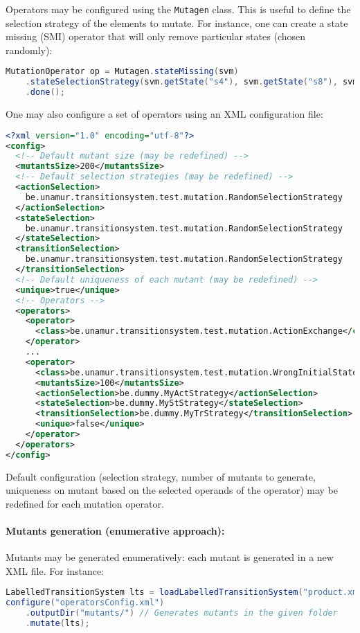 Operators may be configured using the \texttt{Mu\-ta\-gen} class. This is useful to define the selection strategy of the elements to mutate. For instance, one can create a state missing (SMI) operator that will only remove particular states (chosen randomly):
%
\begin{lstlisting}[language=Java,frame=single,numbers=none]
MutationOperator op = Mutagen.stateMissing(svm)
	.stateSelectionStrategy(svm.getState("s4"), svm.getState("s8"), svm.getState("s9"))
	.done();
\end{lstlisting}
%
One may also configure a set of operators using an XML configuration file:
%
\begin{lstlisting}[language=XML,frame=single,numbers=none]
<?xml version="1.0" encoding="utf-8"?>
<config>
  <!-- Default mutant size (may be redefined) -->
  <mutantsSize>200</mutantsSize>
  <!-- Default selection strategies (may be redefined) -->
  <actionSelection>
    be.unamur.transitionsystem.test.mutation.RandomSelectionStrategy
  </actionSelection>
  <stateSelection>
    be.unamur.transitionsystem.test.mutation.RandomSelectionStrategy
  </stateSelection>
  <transitionSelection>
    be.unamur.transitionsystem.test.mutation.RandomSelectionStrategy
  </transitionSelection>
  <!-- Default uniqueness of each mutant (may be redefined) -->
  <unique>true</unique>
  <!-- Operators -->
  <operators>
    <operator>
      <class>be.unamur.transitionsystem.test.mutation.ActionExchange</class>
    </operator>
    ...
    <operator>
      <class>be.unamur.transitionsystem.test.mutation.WrongInitialState</class>
      <mutantsSize>100</mutantsSize>
      <actionSelection>be.dummy.MyActStrategy</actionSelection>
      <stateSelection>be.dummy.MyStStrategy</stateSelection>
      <transitionSelection>be.dummy.MyTrStrategy</transitionSelection>
      <unique>false</unique>
    </operator>
  </operators>
</config>
\end{lstlisting}
%
Default configuration (selection strategy, number of mutants to generate, uniqueness on mutant based on the selected operands of the operator) may be redefined for each mutation operator.

\paragraph{Mutants generation (enumerative approach):}

Mutants may be generated enumeratively: each mutant is generated in a new XML file. For instance:
%
\begin{lstlisting}[language=Java,frame=single,numbers=none]
LabelledTransitionSystem lts = loadLabelledTransitionSystem("product.xml");
configure("operatorsConfig.xml")
	.outputDir("mutants/") // Generates mutants in the given folder
	.mutate(lts);
\end{lstlisting}
%

